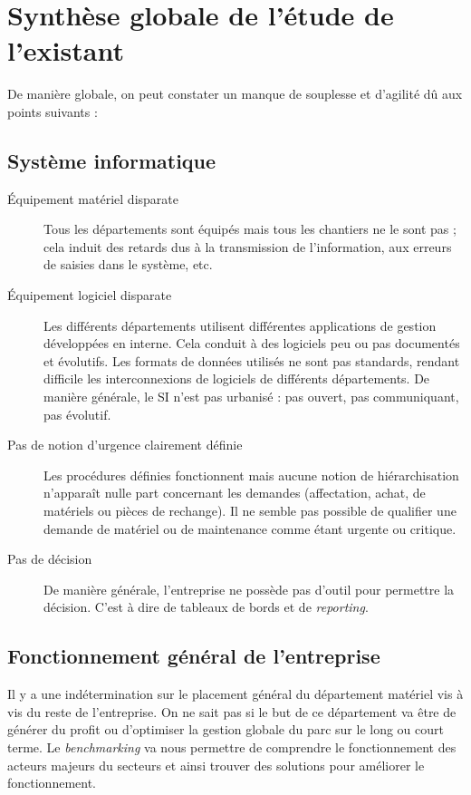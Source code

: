 \section{Synthèse globale de l'étude de l'existant}

De manière globale, on peut constater un manque de souplesse et d'agilité dû
aux points suivants :

\subsection{Système informatique}

\begin{description}

\item[Équipement matériel disparate]\el
Tous les départements sont équipés mais tous les chantiers ne le sont pas ;
cela induit des retards dus à la transmission de l'information, aux erreurs
de saisies dans le système, etc.  

\item[Équipement logiciel disparate]\el
Les différents départements utilisent différentes applications de gestion
développées en interne. Cela conduit à des logiciels peu ou pas documentés
et évolutifs. Les formats de données utilisés ne sont pas standards,
rendant difficile les interconnexions de logiciels de différents
départements. De manière générale, le SI n'est pas urbanisé : pas ouvert,
pas communiquant, pas évolutif.

\item[Pas de notion d'urgence clairement définie]\el
Les procédures définies fonctionnent mais aucune notion de hiérarchisation
n'apparaît nulle part concernant les demandes (affectation, achat, de
matériels ou pièces de rechange).  Il ne semble pas possible de qualifier
une demande de matériel ou de maintenance comme étant urgente ou critique.

\item[Pas de décision]\el
De manière générale, l'entreprise ne possède pas d'outil pour permettre la 
décision. C'est à dire de tableaux de bords et de {\sl reporting}.

\end{description}

\subsection{Fonctionnement général de l'entreprise}

Il y a une indétermination sur le placement général du département matériel 
vis à vis du reste de l'entreprise. On ne sait pas si le but de ce département
va être de générer du profit ou d'optimiser la gestion globale du parc sur le long
ou court terme. Le {\sl benchmarking} va nous permettre de comprendre le 
fonctionnement des acteurs majeurs du secteurs et ainsi trouver des solutions
pour améliorer le fonctionnement.

